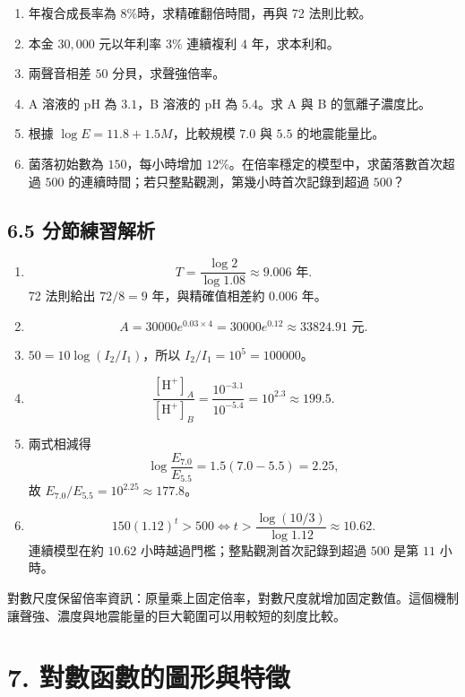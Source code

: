 \documentclass[11pt,a4paper]{article}
\providecommand{\tightlist}{%
  \setlength{\itemsep}{0pt}\setlength{\parskip}{0pt}}
\begin{document}
\begin{enumerate}
\def\labelenumi{\arabic{enumi}.}
\tightlist
\item
  年複合成長率為 \(8\%\)時，求精確翻倍時間，再與 72 法則比較。
\item
  本金 \(30{,}000\) 元以年利率 \(3\%\) 連續複利 \(4\) 年，求本利和。
\item
  兩聲音相差 \(50\) 分貝，求聲強倍率。
\item
  A 溶液的 pH 為 \(3.1\)，B 溶液的 pH 為 \(5.4\)。求 A 與 B 的氫離子濃度比。
\item
  根據 \(\log E=11.8+1.5M\)，比較規模 \(7.0\) 與 \(5.5\) 的地震能量比。
\item
  菌落初始數為 \(150\)，每小時增加 \(12\%\)。在倍率穩定的模型中，求菌落數首次超過 \(500\) 的連續時間；若只整點觀測，第幾小時首次記錄到超過 \(500\)？
\end{enumerate}

\subsection{6.5 分節練習解析}\label{ux5206ux7bc0ux7df4ux7fd2ux89e3ux6790-5}

\begin{enumerate}
\def\labelenumi{\arabic{enumi}.}
\tightlist
\item
  \[
   T=\frac{\log2}{\log1.08}\approx9.006\text{ 年}.
   \]
  72 法則給出 \(72/8=9\) 年，與精確值相差約 \(0.006\) 年。
\item
  \[
   A=30000e^{0.03\times4}=30000e^{0.12}\approx33824.91\text{ 元}.
   \]
\item
  \(50=10\log(I_2/I_1)\)，所以 \(I_2/I_1=10^5=100000\)。
\item
  \[
   \frac{[\mathrm H^+]_A}{[\mathrm H^+]_B}
   =\frac{10^{-3.1}}{10^{-5.4}}=10^{2.3}\approx199.5.
   \]
\item
  兩式相減得
  \[
  \log\frac{E_{7.0}}{E_{5.5}}=1.5(7.0-5.5)=2.25,
  \]
  故 \(E_{7.0}/E_{5.5}=10^{2.25}\approx177.8\)。
\item
  \[
   150(1.12)^t>500
   \Longleftrightarrow
   t>\frac{\log(10/3)}{\log1.12}\approx10.62.
   \]
  連續模型在約 \(10.62\) 小時越過門檻；整點觀測首次記錄到超過 \(500\) 是第 \(11\) 小時。
\end{enumerate}

對數尺度保留倍率資訊：原量乘上固定倍率，對數尺度就增加固定數值。這個機制讓聲強、濃度與地震能量的巨大範圍可以用較短的刻度比較。

\section{7. 對數函數的圖形與特徵}\label{ux5c0dux6578ux51fdux6578ux7684ux5716ux5f62ux8207ux7279ux5fb5}
\end{document}
